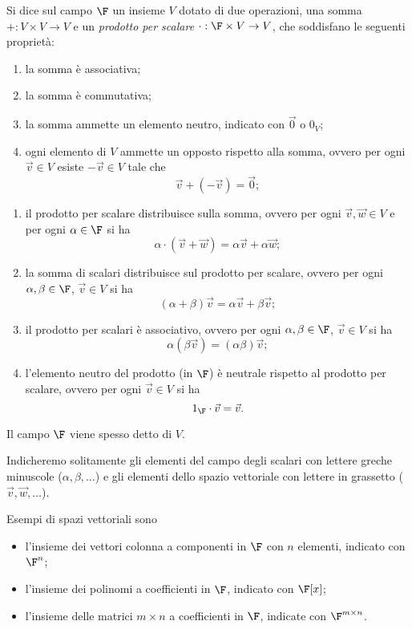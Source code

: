 \begin{definition}
    Si dice  sul campo $\F$ un insieme $V$ dotato di due operazioni, una somma $+ : V \times V \to V$ e un \emph{prodotto per scalare} $\cdot : \F \times V \to V$, che soddisfano le seguenti proprietà: \begin{enumerate}[(S1)]
        \item la somma è associativa;
        \item la somma è commutativa;
        \item la somma ammette un elemento neutro, indicato con $\vec{0}$ o $0_V$;
        \item ogni elemento di $V$ ammette un opposto rispetto alla somma, ovvero per ogni $\vec{v} \in V$ esiste $-\vec v \in V$ tale che \[
            \vec v + (-\vec v) = \vec 0;
        \]
    \end{enumerate} \begin{enumerate}[(P1)]
        \item il prodotto per scalare distribuisce sulla somma, ovvero per ogni $\vec v, \vec w \in V$ e per ogni $\alpha \in \F$ si ha \[
            \alpha \cdot (\vec v + \vec w) = \alpha \vec v + \alpha \vec w;
        \] 
        \item la somma di scalari distribuisce sul prodotto per scalare, ovvero per ogni $\alpha, \beta \in \F$, $\vec v \in V$ si ha \[
            (\alpha + \beta) \vec v = \alpha \vec v + \beta \vec v;
        \] 
        \item il prodotto per scalari è associativo, ovvero per ogni $\alpha, \beta \in \F$, $\vec v \in V$ si ha \[
            \alpha(\beta\vec v) = (\alpha\beta)\vec v;
        \] 
        \item l'elemento neutro del prodotto (in $\F$) è neutrale rispetto al prodotto per scalare, ovvero per ogni $\vec v \in V$ si ha \[
            1_\F \cdot \vec v = \vec v.
        \]
    \end{enumerate} 
    Il campo $\F$ viene spesso detto  di $V$.
\end{definition}

Indicheremo solitamente gli elementi del campo degli scalari con lettere greche minuscole ($\alpha, \beta, \dots$) e gli elementi dello spazio vettoriale con lettere in grassetto ($\vec v, \vec w, \dots$).

Esempi di spazi vettoriali sono \begin{itemize}
    \item l'insieme dei vettori colonna a componenti in $\F$ con $n$ elementi, indicato con $\F^n$; 
    \item l'insieme dei polinomi a coefficienti in $\F$, indicato con $\F[x]$;
    \item l'insieme delle matrici $m \times n$ a coefficienti in $\F$, indicate con $\Mat{\F, m, n}$.   
\end{itemize}

